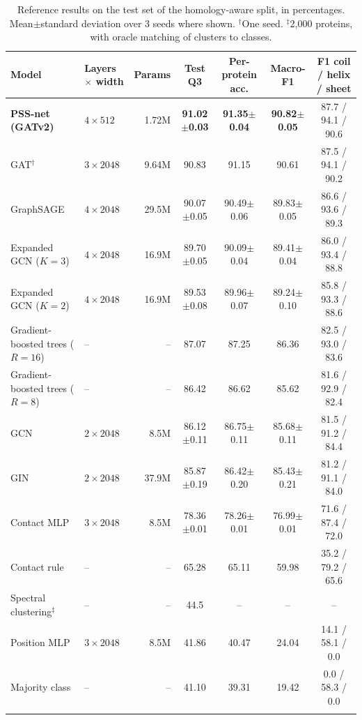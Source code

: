 \documentclass[pdflatex,sn-mathphys-num]{sn-jnl}
\begin{document}
\begin{table}
\caption{Reference results on the test set of the homology-aware split, in percentages. Mean$\pm$standard deviation over 3 seeds where shown. $^\dagger$One seed. $^\ddagger$2,000 proteins, with oracle matching of clusters to classes.}
\label{tab:main}
\begin{tabular}{llrcccc}
\toprule
Model & Layers $\times$ width & Params & Test Q3 & Per-protein acc. & Macro-F1 & F1 coil / helix / sheet \\
\midrule
\textbf{PSS-net (GATv2)} & $4 \times 512$ & 1.72M & \textbf{91.02$\pm$0.03} & \textbf{91.35$\pm$0.04} & \textbf{90.82$\pm$0.05} & 87.7 / 94.1 / 90.6 \\
GAT$^\dagger$ & $3 \times 2048$ & 9.64M & 90.83 & 91.15 & 90.61 & 87.5 / 94.1 / 90.2 \\
GraphSAGE & $4 \times 2048$ & 29.5M & 90.07$\pm$0.05 & 90.49$\pm$0.06 & 89.83$\pm$0.05 & 86.6 / 93.6 / 89.3 \\
Expanded GCN ($K=3$) & $4 \times 2048$ & 16.9M & 89.70$\pm$0.05 & 90.09$\pm$0.04 & 89.41$\pm$0.04 & 86.0 / 93.4 / 88.8 \\
Expanded GCN ($K=2$) & $4 \times 2048$ & 16.9M & 89.53$\pm$0.08 & 89.96$\pm$0.07 & 89.24$\pm$0.10 & 85.8 / 93.3 / 88.6 \\
Gradient-boosted trees ($R=16$) & -- & -- & 87.07 & 87.25 & 86.36 & 82.5 / 93.0 / 83.6 \\
Gradient-boosted trees ($R=8$) & -- & -- & 86.42 & 86.62 & 85.62 & 81.6 / 92.9 / 82.4 \\
GCN & $2 \times 2048$ & 8.5M & 86.12$\pm$0.11 & 86.75$\pm$0.11 & 85.68$\pm$0.11 & 81.5 / 91.2 / 84.4 \\
GIN & $2 \times 2048$ & 37.9M & 85.87$\pm$0.19 & 86.42$\pm$0.20 & 85.43$\pm$0.21 & 81.2 / 91.1 / 84.0 \\
Contact MLP & $3 \times 2048$ & 8.5M & 78.36$\pm$0.01 & 78.26$\pm$0.01 & 76.99$\pm$0.01 & 71.6 / 87.4 / 72.0 \\
Contact rule & -- & -- & 65.28 & 65.11 & 59.98 & 35.2 / 79.2 / 65.6 \\
Spectral clustering$^\ddagger$ & -- & -- & 44.5 & -- & -- & -- \\
Position MLP & $3 \times 2048$ & 8.5M & 41.86 & 40.47 & 24.04 & 14.1 / 58.1 / 0.0 \\
Majority class & -- & -- & 41.10 & 39.31 & 19.42 & 0.0 / 58.3 / 0.0 \\
\botrule
\end{tabular}
\end{table}
\end{document}
